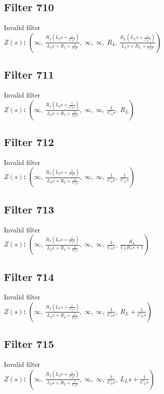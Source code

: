 \documentclass{article}
\begin{document}
\subsection*{Filter 710}
Invalid filter \\ 
\textbf{$Z(s)$:} $\left( \infty, \  \frac{R_{2} \left(L_{2} s + \frac{1}{C_{2} s}\right)}{L_{2} s + R_{2} + \frac{1}{C_{2} s}}, \  \infty, \  \infty, \  R_{4}, \  \frac{R_{L} \left(L_{L} s + \frac{1}{C_{L} s}\right)}{L_{L} s + R_{L} + \frac{1}{C_{L} s}}\right)$ \\ 
\subsection*{Filter 711}
Invalid filter \\ 
\textbf{$Z(s)$:} $\left( \infty, \  \frac{R_{2} \left(L_{2} s + \frac{1}{C_{2} s}\right)}{L_{2} s + R_{2} + \frac{1}{C_{2} s}}, \  \infty, \  \infty, \  \frac{1}{C_{4} s}, \  R_{L}\right)$ \\ 
\subsection*{Filter 712}
Invalid filter \\ 
\textbf{$Z(s)$:} $\left( \infty, \  \frac{R_{2} \left(L_{2} s + \frac{1}{C_{2} s}\right)}{L_{2} s + R_{2} + \frac{1}{C_{2} s}}, \  \infty, \  \infty, \  \frac{1}{C_{4} s}, \  \frac{1}{C_{L} s}\right)$ \\ 
\subsection*{Filter 713}
Invalid filter \\ 
\textbf{$Z(s)$:} $\left( \infty, \  \frac{R_{2} \left(L_{2} s + \frac{1}{C_{2} s}\right)}{L_{2} s + R_{2} + \frac{1}{C_{2} s}}, \  \infty, \  \infty, \  \frac{1}{C_{4} s}, \  \frac{R_{L}}{C_{L} R_{L} s + 1}\right)$ \\ 
\subsection*{Filter 714}
Invalid filter \\ 
\textbf{$Z(s)$:} $\left( \infty, \  \frac{R_{2} \left(L_{2} s + \frac{1}{C_{2} s}\right)}{L_{2} s + R_{2} + \frac{1}{C_{2} s}}, \  \infty, \  \infty, \  \frac{1}{C_{4} s}, \  R_{L} + \frac{1}{C_{L} s}\right)$ \\ 
\subsection*{Filter 715}
Invalid filter \\ 
\textbf{$Z(s)$:} $\left( \infty, \  \frac{R_{2} \left(L_{2} s + \frac{1}{C_{2} s}\right)}{L_{2} s + R_{2} + \frac{1}{C_{2} s}}, \  \infty, \  \infty, \  \frac{1}{C_{4} s}, \  L_{L} s + \frac{1}{C_{L} s}\right)$ \\ 
\end{document}
